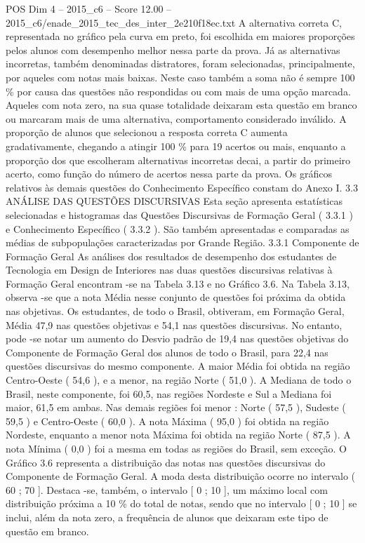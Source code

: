 \begin{textsample}{POS Dim 4 – 2015\_c6 – Score 12.00 – 2015\_c6/enade\_2015\_tec\_des\_inter\_2e210f18ec.txt}
A alternativa correta C, representada no gráfico pela curva em preto, foi escolhida em maiores proporções pelos alunos com desempenho melhor nessa parte da prova.
Já as alternativas incorretas, também denominadas distratores, foram selecionadas, principalmente, por aqueles com notas mais baixas.
Neste caso também a soma não é sempre 100 \% por causa das questões não respondidas ou com mais de uma opção marcada.
Aqueles com nota zero, na sua quase totalidade deixaram esta questão em branco ou marcaram mais de uma alternativa, comportamento considerado inválido.
A proporção de alunos que selecionou a resposta correta C aumenta gradativamente, chegando a atingir 100 \% para 19 acertos ou mais, enquanto a proporção dos que escolheram alternativas incorretas decai, a partir do primeiro acerto, como função do número de acertos nessa parte da prova.
Os gráficos relativos às demais questões do Conhecimento Específico constam do Anexo I. 3.3 ANÁLISE DAS QUESTÕES DISCURSIVAS Esta seção apresenta estatísticas selecionadas e histogramas das Questões Discursivas de Formação Geral ( 3.3.1 ) e Conhecimento Específico ( 3.3.2 ).
São também apresentadas e comparadas as médias de subpopulações caracterizadas por Grande Região. 3.3.1 Componente de Formação Geral As análises dos resultados de desempenho dos estudantes de Tecnologia em Design de Interiores nas duas questões discursivas relativas à Formação Geral encontram -se na Tabela 3.13 e no Gráfico 3.6.
Na Tabela 3.13, observa -se que a nota Média nesse conjunto de questões foi próxima da obtida nas objetivas.
Os estudantes, de todo o Brasil, obtiveram, em Formação Geral, Média 47,9 nas questões objetivas e 54,1 nas questões discursivas.
No entanto, pode -se notar um aumento do Desvio padrão de 19,4 nas questões objetivas do Componente de Formação Geral dos alunos de todo o Brasil, para 22,4 nas questões discursivas do mesmo componente.
A maior Média foi obtida na região Centro-Oeste ( 54,6 ), e a menor, na região Norte ( 51,0 ).
A Mediana de todo o Brasil, neste componente, foi 60,5, nas regiões Nordeste e Sul a Mediana foi maior, 61,5 em ambas.
Nas demais regiões foi menor : Norte ( 57,5 ), Sudeste ( 59,5 ) e Centro-Oeste ( 60,0 ).
A nota Máxima ( 95,0 ) foi obtida na região Nordeste, enquanto a menor nota Máxima foi obtida na região Norte ( 87,5 ).
A nota Mínima ( 0,0 ) foi a mesma em todas as regiões do Brasil, sem exceção.
O Gráfico 3.6 representa a distribuição das notas nas questões discursivas do Componente de Formação Geral.
A moda desta distribuição ocorre no intervalo ( 60 ; 70 ].
Destaca -se, também, o intervalo [ 0 ; 10 ], um máximo local com distribuição próxima a 10 \% do total de notas, sendo que no intervalo [ 0 ; 10 ] se inclui, além da nota zero, a frequência de alunos que deixaram este tipo de questão em branco.

\end{textsample}
